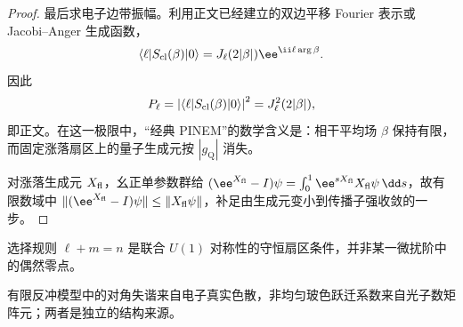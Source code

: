 \begin{proof}
最后求电子边带振幅。利用正文已经建立的双边平移 Fourier 表示或 Jacobi--Anger 生成函数，
\begin{equation*}
\langle\ell|S_{\rm cl}(\beta)|0\rangle
=J_\ell(2|\beta|)\ee^{\ii\ell\arg\beta}.
\end{equation*}
因此
\begin{equation*}
P_\ell
=\left|\langle\ell|S_{\rm cl}(\beta)|0\rangle\right|^2
=J_\ell^2(2|\beta|),
\end{equation*}
即正文。在这一极限中，“经典 PINEM”的数学含义是：相干平均场 \(\beta\) 保持有限，而固定涨落扇区上的量子生成元按 \(|g_{\mathrm Q}|\) 消失。

对涨落生成元 $X_{\rm fl}$，幺正单参数群给 $(\ee^{X_{\rm fl}}-I)\psi=\int_0^1\ee^{sX_{\rm fl}}X_{\rm fl}\psi\,\dd s$，故有限数域中 $\|(\ee^{X_{\rm fl}}-I)\psi\|\le\|X_{\rm fl}\psi\|$，补足由生成元变小到传播子强收敛的一步。
\end{proof}




选择规则 $\ell+m=n$ 是联合 $U(1)$ 对称性的守恒扇区条件，并非某一微扰阶中的偶然零点。

有限反冲模型中的对角失谐来自电子真实色散，非均匀玻色跃迁系数来自光子数矩阵元；两者是独立的结构来源。





